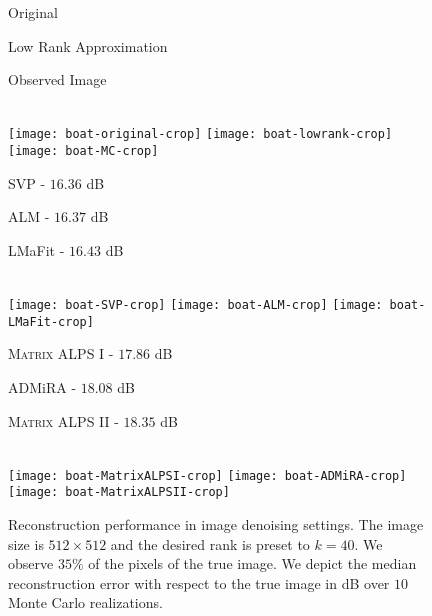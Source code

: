 \documentclass[twocolumn]{svjour3}
\newcommand{\rank}{k}
\begin{document}
\begin{figure*}[!htp]
\centering
\begin{minipage}{0.28\linewidth}
\centering \normalsize{Original}
\end{minipage} 
\begin{minipage}{0.28\linewidth}
\centering \normalsize{Low Rank Approximation}
\end{minipage}
\begin{minipage}{0.28\linewidth}
\centering \normalsize{Observed Image}
\end{minipage} \vspace{0.1cm}\\

\texttt{[image: boat-original-crop]} 
\texttt{[image: boat-lowrank-crop]} 
\texttt{[image: boat-MC-crop]}\\

\centering
\begin{minipage}{0.28\linewidth}
\centering \normalsize{SVP - $16.36$ dB}
\end{minipage} 
\begin{minipage}{0.28\linewidth}
\centering \normalsize{ALM - $16.37$ dB}
\end{minipage}
\begin{minipage}{0.28\linewidth}
\centering \normalsize{LMaFit - $16.43$ dB}
\end{minipage} \vspace{0.1cm}\\

\texttt{[image: boat-SVP-crop]} 
\texttt{[image: boat-ALM-crop]} 
\texttt{[image: boat-LMaFit-crop]} \\

\centering
\begin{minipage}{0.28\linewidth}
\centering \normalsize{\textsc{\textsc{Matrix ALPS I}} - $17.86$ dB}
\end{minipage} 
\begin{minipage}{0.28\linewidth}
\centering \normalsize{ADMiRA - $18.08$ dB}
\end{minipage}
\begin{minipage}{0.28\linewidth}
\centering \normalsize{\textsc{\textsc{Matrix ALPS II}} - $18.35$ dB}
\end{minipage} \vspace{0.1cm}\\

\texttt{[image: boat-MatrixALPSI-crop]} 
\texttt{[image: boat-ADMiRA-crop]} 
\texttt{[image: boat-MatrixALPSII-crop]}\\
\caption{\small{Reconstruction performance in image denoising settings. The image size is $512 \times 512$ and the desired rank is preset to $\rank = 40$. We observe $35\%$ of the pixels of the true image. We depict the median reconstruction error with respect to the true image in dB over $10$ Monte Carlo realizations.}} {\label{fig:real1}}
\end{figure*}
\end{document}
